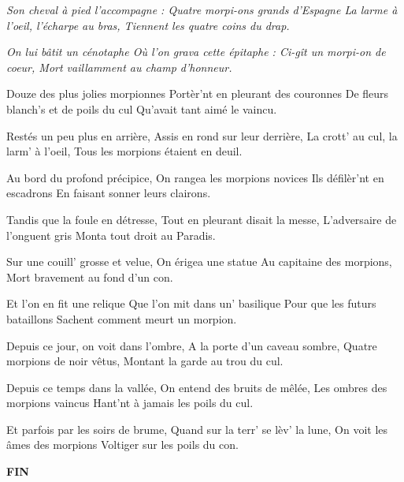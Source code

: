 \beginverse
\textit {Son cheval à pied l'accompagne :
Quatre morpi-ons grands d'Espagne
La larme à l'oeil, l'écharpe au bras,
Tiennent les quatre coins du drap.}
\endverse

\beginverse
\textit {On lui bâtit un cénotaphe
Où l'on grava cette épitaphe :
Ci-gît un morpi-on de coeur,
Mort vaillamment au champ d'honneur.}
\endverse

\beginverse
Douze des plus jolies morpionnes
Portèr'nt en pleurant des couronnes
De fleurs blanch's et de poils du cul
Qu'avait tant aimé le vaincu.
\endverse

\beginverse
Restés un peu plus en arrière,
Assis en rond sur leur derrière,
La crott' au cul, la larm' à l'oeil,
Tous les morpions étaient en deuil.
\endverse

\beginverse
Au bord du profond précipice,
On rangea les morpions novices
Ils défilèr'nt en escadrons
En faisant sonner leurs clairons.
\endverse

\beginverse
Tandis que la foule en détresse,
Tout en pleurant disait la messe,
L'adversaire de l'onguent gris
Monta tout droit au Paradis.
\endverse

\beginverse
Sur une couill' grosse et velue,
On érigea une statue
Au capitaine des morpions,
Mort bravement au fond d'un con.
\endverse

\beginverse
Et l'on en fit une relique
Que l'on mit dans un' basilique
Pour que les futurs bataillons
Sachent comment meurt un morpion.
\endverse

\beginverse
Depuis ce jour, on voit dans l'ombre,
A la porte d'un caveau sombre,
Quatre morpions de noir vêtus,
Montant la garde au trou du cul.
\endverse

\beginverse
Depuis ce temps dans la vallée,
On entend des bruits de mêlée,
Les ombres des morpions vaincus
Hant'nt à jamais les poils du cul.
\endverse

\beginverse
Et parfois par les soirs de brume,
Quand sur la terr' se lèv' la lune,
On voit les âmes des morpions
Voltiger sur les poils du con.

\textbf{FIN}
\endverse

\endsong